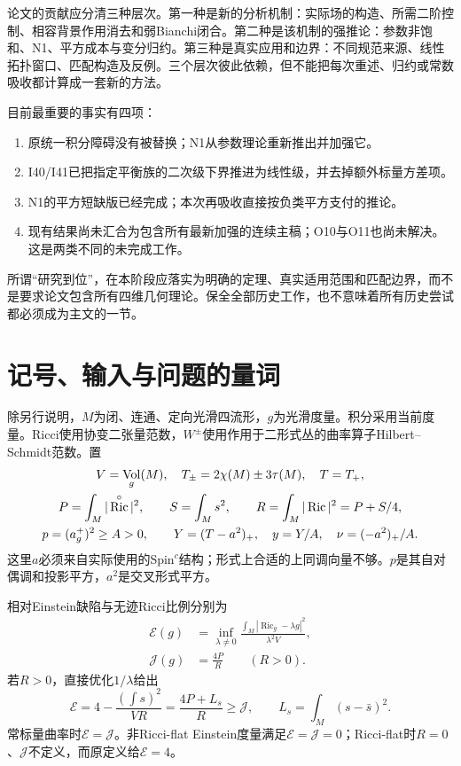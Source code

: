 \documentclass[UTF8,fontset=fandol,zihao=-4,a4paper]{ctexart}
\theoremstyle{remark}
\DeclareMathOperator{\Ric}{Ric}
\DeclareMathOperator{\Vol}{Vol}
\newcommand{\E}{\mathcal E}
\newcommand{\J}{\mathcal J}
\begin{document}
论文的贡献应分清三种层次。第一种是新的分析机制：实际场的构造、所需二阶控制、相容背景作用消去和弱Bianchi闭合。第二种是该机制的强推论：参数非饱和、N1、平方成本与变分归约。第三种是真实应用和边界：不同规范来源、线性拓扑窗口、匹配构造及反例。三个层次彼此依赖，但不能把每次重述、归约或常数吸收都计算成一套新的方法。

目前最重要的事实有四项：
\begin{enumerate}
\item 原统一积分障碍没有被替换；N1从参数理论重新推出并加强它。
\item I40/I41已把指定平衡族的二次级下界推进为线性级，并去掉额外标量方差项。
\item N1的平方短缺版已经完成；本次再吸收直接按负类平方支付的推论。
\item 现有结果尚未汇合为包含所有最新加强的连续主稿；O10与O11也尚未解决。这是两类不同的未完成工作。
\end{enumerate}

所谓“研究到位”，在本阶段应落实为明确的定理、真实适用范围和匹配边界，而不是要求论文包含所有四维几何理论。保全全部历史工作，也不意味着所有历史尝试都必须成为主文的一节。

\section{记号、输入与问题的量词}
\label{sec:notation}

除另行说明，$M$为闭、连通、定向光滑四流形，$g$为光滑度量。积分采用当前度量。Ricci使用协变二张量范数，$W^\pm$使用作用于二形式丛的曲率算子Hilbert--Schmidt范数。置
\begin{gather}
V=\Vol_g(M),\quad T_\pm=2\chi(M)\pm3\tau(M),\quad T=T_+,\notag\\
P=\int_M|\Ric^\circ|^2,\qquad S=\int_Ms^2,\qquad
R=\int_M|\Ric|^2=P+S/4,\label{eq:energies}\\
p=(a_g^+)^2\ge A>0,\qquad
Y=(T-a^2)_+,\quad y=Y/A,\quad \nu=(-a^2)_+/A.\label{eq:costs}
\end{gather}
这里$a$必须来自实际使用的Spin$^c$结构；形式上合适的上同调向量不够。$p$是其自对偶调和投影平方，$a^2$是交叉形式平方。

相对Einstein缺陷与无迹Ricci比例分别为
\begin{align}
\E(g)&=\inf_{\lambda\ne0}
\frac{\int_M|\Ric_g-\lambda g|^2}{\lambda^2V},\label{eq:E}\\
\J(g)&=\frac{4P}{R}\qquad(R>0).\label{eq:J}
\end{align}
若$R>0$，直接优化$1/\lambda$给出
\begin{equation}
\E=4-\frac{(\int s)^2}{VR}
=\frac{4P+L_s}{R}\ge\J,
\qquad L_s=\int_M(s-\bar s)^2.
\label{eq:relative}
\end{equation}
常标量曲率时$\E=\J$。非Ricci-flat Einstein度量满足$\E=\J=0$；Ricci-flat时$R=0$、$\J$不定义，而原定义给$\E=4$。
\end{document}
